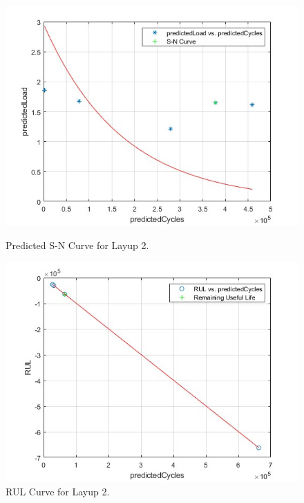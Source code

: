 \begin{figure}[h]
    \centering
    \begin{minipage}{0.45\textwidth}
        \centering
        \includegraphics[width=\linewidth]{s_n_2.jpg}
        \caption{Predicted S-N Curve for Layup 2.}
    \end{minipage}
    \hfill
    \begin{minipage}{0.45\textwidth}
        \centering
        \includegraphics[width=\linewidth]{rul_1.jpg}
        \caption{RUL Curve for Layup 2.}
    \end{minipage}
\end{figure}


